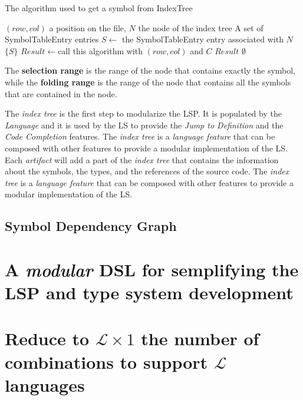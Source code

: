 \begin{algorithm}[tbh]
\caption{The algorithm used to get a symbol from IndexTree}\label{alg:lookup}
\begin{algorithmic}
\Require $(row, col)$ a position on the file, $N$ the node of the index tree
\Ensure A set of SymbolTableEntry entries
\State $S \gets$ the SymbolTableEntry entry associated with $N$
\State \Return $\{S\}$
\State $Result\gets$call this algorithm with $(row, col)$ and $C$
\Return $Result$
\EndIf
\EndFor
\Else
\State \Return $\emptyset$
\EndIf
\end{algorithmic}
\end{algorithm}

The \textbf{selection range} is the range of the node that contains exactly the symbol, while the \textbf{folding range} is the range of the node that contains all the symbols that are contained in the node.

The \textit{index tree} is the first step to modularize the LSP. It is populated by the \textit{Language} and it is used by the LS to provide the \textit{Jump to Definition} and the \textit{Code Completion} features. The \textit{index tree} is a \textit{language feature} that can be composed with other features to provide a modular implementation of the LS.
Each \textit{artifact} will add a part of the \textit{index tree} that contains the information about the symbols, the types, and the references of the source code. The \textit{index tree} is a \textit{language feature} that can be composed with other features to provide a modular implementation of the LS.

\subsection{Symbol Dependency Graph}\label{subsec:concept:SymbolDependencyGraph}



\section{A \textit{modular} DSL for semplifying the LSP and type system development}\label{sec:concept:AModularDSLForSemplifyingTheLSPAndTypeSystemDevelopment}

\section{Reduce to $\mathcal{L} \times 1$ the number of combinations to support $\mathcal{L}$ languages}


